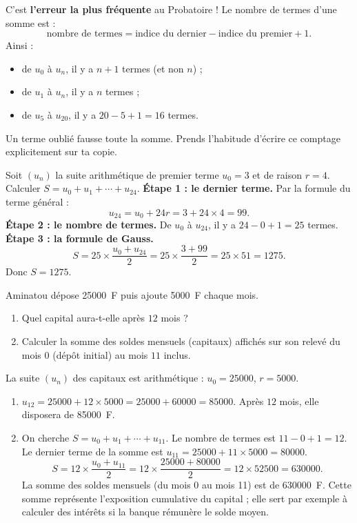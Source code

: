 \documentclass[11pt]{article}
\begin{document}
\begin{attention}
C'est \textbf{l'erreur la plus fréquente} au Probatoire ! Le nombre de termes d'une somme est :
\[ \text{nombre de termes} = \text{indice du dernier} - \text{indice du premier} + 1. \]
Ainsi :
\begin{itemize}
\item de $u_0$ à $u_n$, il y a $n+1$ termes (et non $n$) ;
\item de $u_1$ à $u_n$, il y a $n$ termes ;
\item de $u_5$ à $u_{20}$, il y a $20 - 5 + 1 = 16$ termes.
\end{itemize}
Un terme oublié fausse toute la somme. Prends l'habitude d'écrire ce comptage explicitement sur ta copie.
\end{attention}

\begin{exoresolu}
Soit $(u_n)$ la suite arithmétique de premier terme $u_0 = 3$ et de raison $r = 4$. Calculer $S = u_0 + u_1 + \cdots + u_{24}$.
\tcblower
\textbf{Étape 1 : le dernier terme.} Par la formule du terme général :
\[ u_{24} = u_0 + 24r = 3 + 24 \times 4 = 99. \]
\textbf{Étape 2 : le nombre de termes.} De $u_0$ à $u_{24}$, il y a $24 - 0 + 1 = 25$ termes.
\textbf{Étape 3 : la formule de Gauss.}
\[ S = 25 \times \frac{u_0 + u_{24}}{2} = 25 \times \frac{3 + 99}{2} = 25 \times 51 = 1275. \]
Donc $S = 1275$.
\end{exoresolu}

\begin{exoresolu}
Aminatou dépose \SI{25000}{F} puis ajoute \SI{5000}{F} chaque mois. 
\begin{enumerate}
\item Quel capital aura-t-elle après $12$ mois ?
\item Calculer la somme des soldes mensuels (capitaux) affichés sur son relevé du mois $0$ (dépôt initial) au mois $11$ inclus.
\end{enumerate}
\tcblower
La suite $(u_n)$ des capitaux est arithmétique : $u_0 = 25000$, $r = 5000$.
\begin{enumerate}
\item $u_{12} = 25000 + 12 \times 5000 = 25000 + 60000 = 85000$. Après $12$ mois, elle disposera de \SI{85000}{F}.
\item On cherche $S = u_0 + u_1 + \cdots + u_{11}$.
Le nombre de termes est $11 - 0 + 1 = 12$.
Le dernier terme de la somme est $u_{11} = 25000 + 11 \times 5000 = 80000$.
\[ S = 12 \times \frac{u_0 + u_{11}}{2} = 12 \times \frac{25000 + 80000}{2} = 12 \times 52500 = 630000. \]
La somme des soldes mensuels (du mois 0 au mois 11) est de \SI{630000}{F}. Cette somme représente l'exposition cumulative du capital ; elle sert par exemple à calculer des intérêts si la banque rémunère le solde moyen.
\end{enumerate}
\end{exoresolu}
\end{document}
